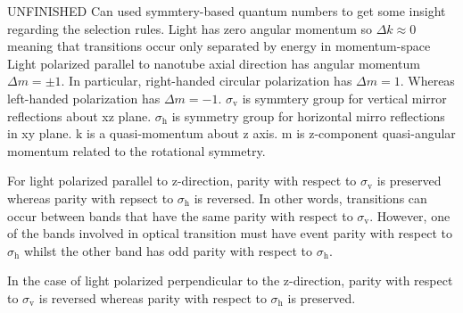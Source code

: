{\color{red} UNFINISHED} Can used symmtery-based quantum numbers to get some insight regarding the selection rules. Light has zero angular momentum so $\Delta k \approx 0$ meaning that transitions occur only separated by energy in momentum-space \cite{bovzovic2000optical}
Light polarized parallel to nanotube axial direction has angular momentum $\Delta m = \pm 1$. In particular, right-handed circular polarization has $\Delta m = 1$. Whereas left-handed polarization has $\Delta m = -1$. $\sigma_\text{v}$ is symmtery group for vertical mirror reflections about xz plane. $\sigma_\text{h}$ is symmetry group for horizontal mirro reflections in xy plane. k is a quasi-momentum about z axis. m is z-component quasi-angular momentum related to the rotational symmetry.

For light polarized parallel to z-direction, parity with respect to $\sigma_\text{v}$ is preserved whereas parity with repsect to $\sigma_\text{h}$ is reversed. In other words, transitions can occur between bands that have the same parity with respect to $\sigma_\text{v}$. However, one of the bands involved in optical transition must have event parity with respect to $\sigma_\text{h}$ whilst the other band has odd parity with respect to $\sigma_\text{h}$.

In the case of light polarized perpendicular to the z-direction, parity with respect to $\sigma_\text{v}$ is reversed whereas parity with respect to $\sigma_\text{h}$ is preserved.

